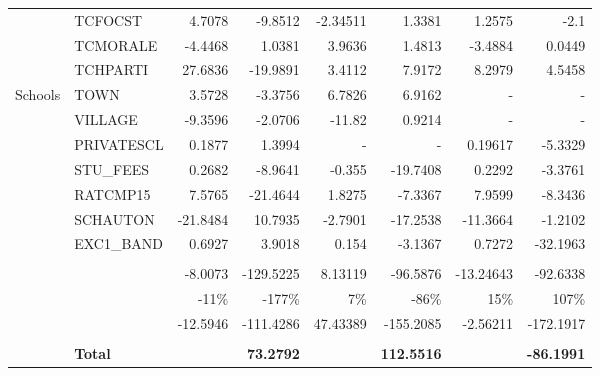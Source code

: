 \documentclass[10pt]{article}
\begin{document}
\begin{table}[htbp]
\begin{tabular}{llrrrrrr}
          & TCFOCST & 4.7078 & -9.8512 & -2.34511 & 1.3381 & 1.2575 & -2.1 \\[0.4em]
          & TCMORALE & -4.4468 & 1.0381 & 3.9636 & 1.4813 & -3.4884 & 0.0449 \\[0.4em]
          & TCHPARTI & 27.6836 & -19.9891 & 3.4112 & 7.9172 & 8.2979 & 4.5458 \\[0.4em]
    Schools & TOWN  & 3.5728 & -3.3756 & 6.7826 & 6.9162 & -     & - \\[0.4em]
          & VILLAGE & -9.3596 & -2.0706 & -11.82 & 0.9214 & -     & - \\[0.4em]
          & PRIVATESCL & 0.1877 & 1.3994 & -     & -     & 0.19617 & -5.3329 \\[0.4em]
          & STU\_FEES & 0.2682 & -8.9641 & -0.355 & -19.7408 & 0.2292 & -3.3761 \\[0.4em]
          & RATCMP15 & 7.5765 & -21.4644 & 1.8275 & -7.3367 & 7.9599 & -8.3436 \\[0.4em]
          & SCHAUTON & -21.8484 & 10.7935 & -2.7901 & -17.2538 & -11.3664 & -1.2102 \\[0.4em]
          & EXC1\_BAND & 0.6927 & 3.9018 & 0.154 & -3.1367 & 0.7272 & -32.1963 \\[0.4em]
          \cline{3-8} \\
          &       & -8.0073 & -129.5225 & 8.13119 & -96.5876 & -13.24643 & -92.6338 \\[0.4em]
          &       & -11\% & -177\% & 7\%   & -86\% & 15\%  & 107\% \\[0.4em]
          &       & -12.5946 & -111.4286 & 47.43389 & -155.2085 & -2.56211 & -172.1917 \\[0.4em]
          \cline{2-8} \\
          & \textbf{Total} & \textbf{} & \textbf{73.2792} & \textbf{} & \textbf{112.5516} & \textbf{} & \textbf{-86.1991} \\
    \bottomrule
    \end{tabular}%
  \label{tab:addlabel}%
\end{table}%
\end{document}
